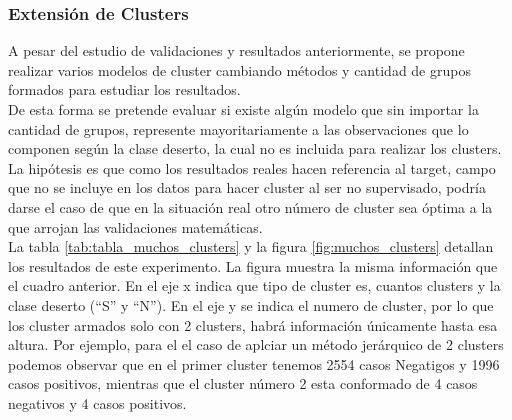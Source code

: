\subsubsection{\textbf{Extensión de Clusters}}

A pesar del estudio de validaciones y resultados anteriormente,
se propone realizar varios modelos de cluster cambiando métodos y cantidad de grupos formados para estudiar los resultados. \\
De esta forma se pretende evaluar si existe algún modelo que sin importar la cantidad de grupos, represente mayoritariamente a las observaciones que lo componen según la clase deserto, la cual no es incluida para realizar los clusters.\\
La hipótesis es que como los resultados reales hacen referencia al target,
campo que no se incluye en los datos para hacer cluster al ser no
supervisado, podría darse el caso de que en la situación real otro
número de cluster sea óptima a la que arrojan las validaciones
matemáticas.\\

La tabla \ref{tab:tabla_muchos_clusters} y la figura \ref{fig:muchos_clusters} detallan los resultados de este experimento. La figura muestra la misma información que el cuadro anterior. En el eje
x indica que tipo de cluster es, cuantos clusters y la clase deserto
(``S'' y ``N''). En el eje y se indica el numero de cluster, por lo que
los cluster armados solo con 2 clusters, habrá información únicamente
hasta esa altura. Por ejemplo, para el el caso de aplciar un método
jerárquico de 2 clusters podemos observar que en el primer cluster
tenemos 2554 casos Negatigos y 1996 casos positivos, mientras que el
cluster número 2 esta conformado de 4 casos negativos y 4 casos
positivos.


